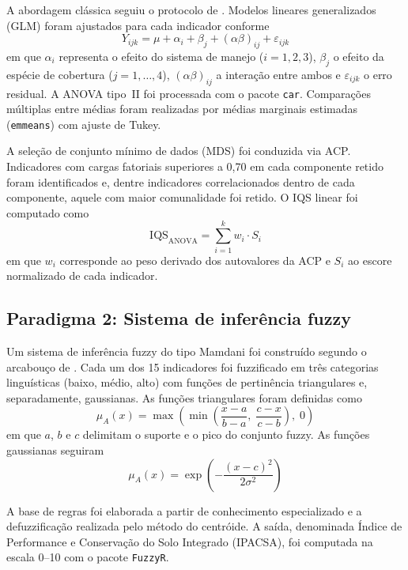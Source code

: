\documentclass[pdflatex,sn-basic]{sn-jnl}%
\begin{document}
A abordagem clássica seguiu o protocolo de \cite{Andrews2002}. Modelos lineares generalizados (GLM) foram ajustados para cada indicador conforme
\begin{equation}
Y_{ijk} = \mu + \alpha_i + \beta_j + (\alpha\beta)_{ij} + \varepsilon_{ijk}
\label{eq:glm}
\end{equation}
em que $\alpha_i$ representa o efeito do sistema de manejo ($i = 1, 2, 3$), $\beta_j$ o efeito da espécie de cobertura ($j = 1, \ldots, 4$), $(\alpha\beta)_{ij}$ a interação entre ambos e $\varepsilon_{ijk}$ o erro residual. A ANOVA tipo~II foi processada com o pacote \texttt{car}. Comparações múltiplas entre médias foram realizadas por médias marginais estimadas (\texttt{emmeans}) com ajuste de Tukey.

A seleção de conjunto mínimo de dados (MDS) foi conduzida via ACP. Indicadores com cargas fatoriais superiores a 0,70 em cada componente retido foram identificados e, dentre indicadores correlacionados dentro de cada componente, aquele com maior comunalidade foi retido. O IQS linear foi computado como
\begin{equation}
\text{IQS}_{\text{ANOVA}} = \sum_{i=1}^{k} w_i \cdot S_i
\label{eq:sqi_anova}
\end{equation}
em que $w_i$ corresponde ao peso derivado dos autovalores da ACP e $S_i$ ao escore normalizado de cada indicador.

\subsection{Paradigma 2: Sistema de inferência fuzzy}\label{subsec:fuzzy}

Um sistema de inferência fuzzy do tipo Mamdani foi construído segundo o arcabouço de \cite{Torbert2008}. Cada um dos 15 indicadores foi fuzzificado em três categorias linguísticas (baixo, médio, alto) com funções de pertinência triangulares e, separadamente, gaussianas. As funções triangulares foram definidas como
\begin{equation}
\mu_A(x) = \max\left(\min\left(\frac{x-a}{b-a},\; \frac{c-x}{c-b}\right),\; 0\right)
\label{eq:trimf}
\end{equation}
em que $a$, $b$ e $c$ delimitam o suporte e o pico do conjunto fuzzy. As funções gaussianas seguiram
\begin{equation}
\mu_A(x) = \exp\left(-\frac{(x-c)^2}{2\sigma^2}\right)
\label{eq:gaussmf}
\end{equation}

A base de regras foi elaborada a partir de conhecimento especializado e a defuzzificação realizada pelo método do centróide. A saída, denominada Índice de Performance e Conservação do Solo Integrado (IPACSA), foi computada na escala 0--10 com o pacote \texttt{FuzzyR}.
\end{document}
